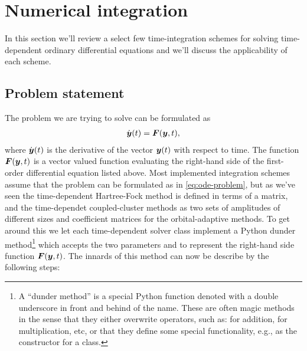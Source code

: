     \section{Numerical integration}
        \label{sec:numerical-integration}
        In this section we'll review a select few time-integration schemes for
        solving time-dependent ordinary differential equations and we'll discuss the
        applicability of each scheme.

        \subsection{Problem statement}
            The problem we are trying to solve can be formulated as
            \begin{align}
                \dot{\boldsymbol{y}}(t) = \boldsymbol{F}(\boldsymbol{y}, t),
                \label{eq:ode-problem}
            \end{align}
            where $\dot{\boldsymbol{y}}(t)$ is the derivative of the vector
            $\boldsymbol{y}(t)$ with respect to time.
            The function $\boldsymbol{F}(\boldsymbol{y}, t)$ is a vector valued function
            evaluating the right-hand side of the first-order differential
            equation listed above.
            Most implemented integration schemes assume that the problem can
            be formulated as in \autoref{eq:ode-problem}, but as we've seen the
            time-dependent Hartree-Fock method is defined in terms of a matrix,
            and the time-dependet coupled-cluster methods as two sets of
            amplitudes of different sizes and coefficient matrices for the
            orbital-adaptive methods.
            To get around this we let each time-dependent solver class implement
            a Python dunder method\footnote{%
                A ``dunder method'' is a special Python function denoted with a
                double underscore in front and behind of the name.
                These are often magic methods in the sense that they either
                overwrite operators, such as:  for addition,
                 for multiplication, etc, or that they define some
                special functionality, e.g.,  as the constructor
                for a class.
            }  which accepts the two
            parameters  and  to represent the right-hand side
            function $\boldsymbol{F}(\boldsymbol{y}, t)$.
            The innards of this method can now be describe by the following
            steps:
